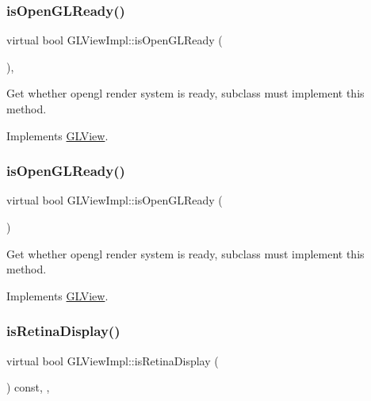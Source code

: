 \subsubsection{\texorpdfstring{is\+Open\+G\+L\+Ready()}{isOpenGLReady()}\hspace{0.1cm}{\footnotesize\ttfamily [8/9]}}
{\footnotesize\ttfamily virtual bool G\+L\+View\+Impl\+::is\+Open\+G\+L\+Ready (\begin{DoxyParamCaption}{ }\end{DoxyParamCaption})\hspace{0.3cm}{\ttfamily [override]}, {\ttfamily [virtual]}}

Get whether opengl render system is ready, subclass must implement this method. 

Implements \hyperlink{classGLView_a23326d6cbff86205a0d5fa953557838d}{G\+L\+View}.

\mbox{\label{classGLViewImpl_a4fdf5280c768291ab6a46731639f8829}} 
\subsubsection{\texorpdfstring{is\+Open\+G\+L\+Ready()}{isOpenGLReady()}\hspace{0.1cm}{\footnotesize\ttfamily [9/9]}}
{\footnotesize\ttfamily virtual bool G\+L\+View\+Impl\+::is\+Open\+G\+L\+Ready (\begin{DoxyParamCaption}{ }\end{DoxyParamCaption})\hspace{0.3cm}{\ttfamily [virtual]}}

Get whether opengl render system is ready, subclass must implement this method. 

Implements \hyperlink{classGLView_a23326d6cbff86205a0d5fa953557838d}{G\+L\+View}.

\mbox{\label{classGLViewImpl_a3c02a8e95e8f2ee4821935f78be3f6b0}} 
\subsubsection{\texorpdfstring{is\+Retina\+Display()}{isRetinaDisplay()}\hspace{0.1cm}{\footnotesize\ttfamily [1/2]}}
{\footnotesize\ttfamily virtual bool G\+L\+View\+Impl\+::is\+Retina\+Display (\begin{DoxyParamCaption}{ }\end{DoxyParamCaption}) const\hspace{0.3cm}{\ttfamily [inline]}, {\ttfamily [override]}, {\ttfamily [virtual]}}

